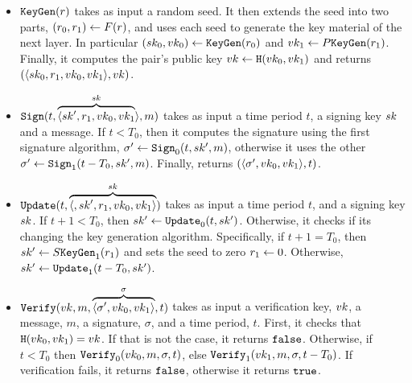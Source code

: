 \begin{itemize}
    \item $\texttt{KeyGen}(r)$ takes as input a random seed. It then extends the seed into two parts,
    $(r_0, r_1)\gets F(r)$, and uses each seed to generate the key material of the next layer. In
    particular $(sk_0, vk_0)\gets\texttt{KeyGen}(r_0)$ and $vk_1\gets P\texttt{KeyGen}(r_1)$. Finally, it computes
    the pair's public key $vk\gets\texttt{H}(vk_0, vk_1)$ and returns $(\langle sk_0, r_1, vk_0,
    vk_1\rangle, vk)$.
    \item $\texttt{Sign}(t, \overbrace{\langle sk', r_1, vk_0, vk_1}^{sk}\rangle, m)$
    takes as input a time period $t$, a signing key $sk$ and a message. If $t<T_0$, then it computes the
    signature using the first signature algorithm, $\sigma'\gets\texttt{Sign}_0(t, sk', m)$, otherwise it uses the
    other $\sigma'\gets\texttt{Sign}_1(t - T_0, sk', m)$. Finally, returns $(\langle\sigma', vk _0, vk_1\rangle,
    t)$.
    \item $\texttt{Update}(t, \overbrace{\langle, sk', r_1, vk_0, vk_1\rangle}^{sk})$ takes as input
    a time period $t$, and a signing key $sk$. If $t+1<T_0$, then $sk'\gets\texttt{Update}_0(t,
    sk')$. Otherwise, it checks if its changing the key
    generation algorithm. Specifically, if $t+1=T_0$, then $sk'\gets S\texttt{KeyGen}_1(r_1)$ and sets the seed
    to zero $r_1\gets 0$. Otherwise, $sk'\gets\texttt{Update}_1(t-T_0, sk')$.
    \item $\texttt{Verify}(vk, m, \overbrace{\langle\sigma', vk_0, vk_1\rangle}^{\sigma},  t)$ takes as input
    a verification key, $vk$, a message, $m$, a signature, $\sigma$, and a time period, $t$. First, it
    checks that $\texttt{H}(vk_0, vk_1) = vk$. If that is not the case, it returns $\texttt{false}$. Otherwise, if $t<T_0$
    then $\texttt{Verify}_0(vk_0, m, \sigma, t)$, else $\texttt{Verify}_1(vk_1, m, \sigma, t-T_0)$. If verification fails, it
    returns $\texttt{false}$, otherwise it returns $\texttt{true}$.
\end{itemize}

